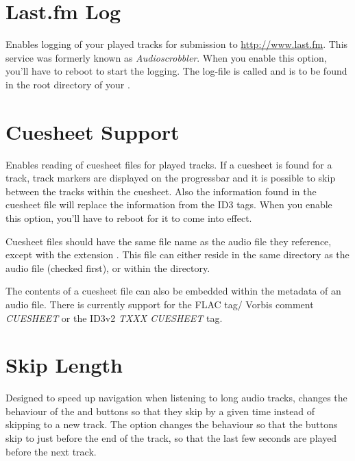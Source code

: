 \section{Last.fm Log}
  Enables logging of your played tracks for submission to 
  \url{http://www.last.fm}. This service was formerly known as 
  \emph{Audioscrobbler}. When you enable this option, you'll have to reboot to
  start the logging. The log-file is called 
  and is to be found in the root directory of your \dap{}.\\


\section{Cuesheet Support}
  Enables reading of cuesheet files for played tracks. If a cuesheet is found
  for a track, track markers are displayed on the progressbar and it is
  possible to skip between the tracks within the cuesheet. Also the information
  found in the cuesheet file will replace the information from the ID3 tags.
  When you enable this option, you'll have to reboot for it to come into
  effect.

  Cuesheet files should have the same file name as the audio file they
  reference, except with the extension . This file can either
  reside in the same directory as the audio file (checked first), or within the
   directory.
  
  The contents of a cuesheet file can also be embedded within the metadata of
  an audio file. There is currently support for the FLAC tag/ Vorbis comment
  \emph{CUESHEET} or the ID3v2 \emph{TXXX CUESHEET} tag.
  
\section{Skip Length}
  Designed to speed up navigation when listening to long audio tracks,
   changes the behaviour of
  the \ActionWpsSkipPrev{} and \ActionWpsSkipNext{} buttons so that they skip
  by a given time instead of skipping to a new track.
  The  option changes the behaviour so that the buttons
  skip to just before the end of the track, so that the last few seconds are
  played before the next track.

